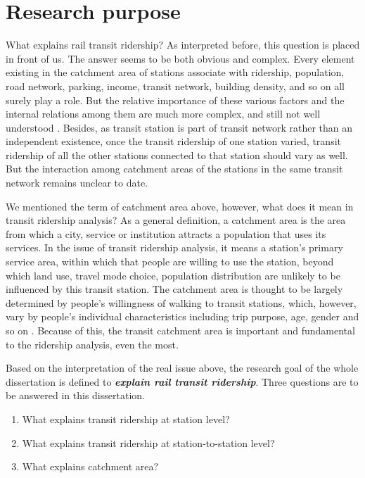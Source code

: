% 
\section{Research purpose}
What explains rail transit ridership? As interpreted before, this question is placed in front of us. The answer seems to be both obvious and complex. Every element existing in the catchment area of stations associate with ridership, population, road network, parking, income, transit network, building density, and so on all surely play a role. But the relative importance of these various factors and the internal relations among them are much more complex, and still not well understood \cite{taylor2003factors}. Besides, as transit station is part of transit network rather than an independent existence, once the transit ridership of one station varied, transit ridership of all the other stations connected to that station should vary as well. But the interaction among catchment areas of the stations in the same transit network remains unclear to date.

We mentioned the term of catchment area above, however, what does it mean in transit ridership analysis? As a general definition, a catchment area is the area from which a city, service or institution attracts a population that uses its services. In the issue of transit ridership analysis, it means a station's primary service area, within which that people are willing to use the station, beyond which land use, travel mode choice, population distribution are unlikely to be influenced by this transit station. The catchment area is thought to be largely determined by people's willingness of walking to transit stations, which, however, vary by people's individual characteristics including trip purpose, age, gender and so on \cite{guerra2013half}. Because of this, the transit catchment area is important and fundamental to the ridership analysis, even the most.

Based on the interpretation of the real issue above, the research goal of the whole dissertation is defined to \emph{\textbf{explain rail transit ridership}}. Three questions are to be answered in this dissertation.

\begin{enumerate}
	\setlength{\parskip}{0\baselineskip} %
	\item What explains transit ridership at station level?
	\item What explains transit ridership at station-to-station level?
	\item What explains catchment area?
	\setlength{\parskip}{0.7\baselineskip} %
\end{enumerate}

